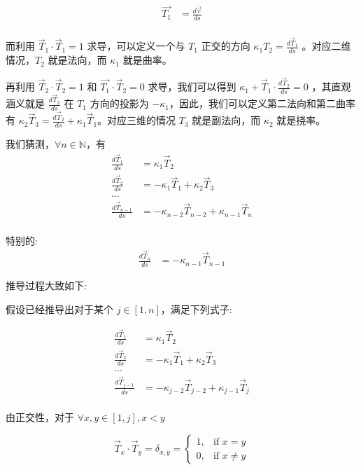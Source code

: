 \documentclass[fontset=windows]{article}
\begin{document}
$$
\begin{aligned}
    \vec{T_1} &= \frac{d\vec{r}}{ds} \\ 
\end{aligned}
$$

而利用 $\vec{T}_1\cdot\vec{T}_1 = 1$ 求导，可以定义一个与 $T_1$ 正交的方向 ${\kappa_1} T_2 = \frac{d\vec{T}_1}{ds}$ 。对应二维情况，$T_2$ 就是法向，而 $\kappa_1$ 就是曲率。

再利用 $\vec{T}_2\cdot\vec{T}_2 = 1$ 和 $\vec{T_1}\cdot\vec{T}_2 = 0$ 求导，我们可以得到 $\kappa_1 + \vec{T}_1 \cdot \frac{d\vec{T}_2}{ds} = 0 $ ，其直观涵义就是 $\frac{d\vec{T}_2}{ds}$ 在 $T_1$ 方向的投影为 $-\kappa_1$，因此，我们可以定义第二法向和第二曲率有 $\kappa_2 \vec{T}_3 = \frac{d\vec{T}_2}{ds} + \kappa_1 \vec{T}_1$。对应三维的情况 $T_3$ 就是副法向，而 $\kappa_2$ 就是挠率。

我们猜测，$\forall n \in \mathbb{N}$，有
$$
\begin{aligned}    
    \frac{d\vec{T}_1}{ds}   &= \kappa_1 \vec{T}_2 \\
    \frac{d\vec{T}_2}{ds}   &= -\kappa_1 \vec{T}_1  + \kappa_2 \vec{T}_3 \\
    ...\\
    \frac{d\vec{T}_{n-1}}{ds} &= -\kappa_{n-2} \vec{T}_{n-2}  + \kappa_{n-1} \vec{T}_{n} \\
\end{aligned}
$$

特别的:
$$
\begin{aligned}
    \frac{d\vec{T}_{n}}{ds} &= -\kappa_{n-1} \vec{T}_{n-1}
\end{aligned}
$$

推导过程大致如下:

假设已经推导出对于某个 $j \in [1,n]$，满足下列式子:

$$
\begin{aligned}    
    \frac{d\vec{T}_1}{ds}   &= \kappa_1 \vec{T}_2 \\
    \frac{d\vec{T}_2}{ds}   &= -\kappa_1 \vec{T}_1  + \kappa_2 \vec{T}_3 \\
    ...\\
    \frac{d\vec{T}_{j-1}}{ds} &= -\kappa_{j-2} \vec{T}_{j-2}  + \kappa_{j-1} \vec{T}_{j} \\
\end{aligned}
$$


由正交性，对于 $\forall x,y \in [1,j], x < y$

$$
\vec{T}_x \cdot \vec{T}_y = \delta_{x,y} =
\begin{cases}
    1   ,&\text{if $x = y$}       \\
    0   ,&\text{if $x \ne y$}
\end{cases}
$$
\end{document}
